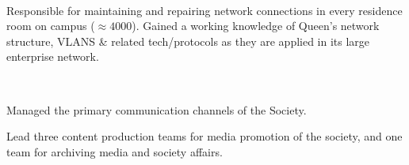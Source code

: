 \documentclass[]{hieudo-build}
\begin{document}
\begin{minipage}[t]{0.69\textwidth}
\\
\begin{tightemize}
\item Responsible for maintaining and repairing network connections in every residence room on campus ($\approx 4000$). Gained a working knowledge of Queen's network structure, VLANS \& related tech/protocols as they are applied in its large enterprise network.
\end{tightemize}
\sectionsep

 \\
\begin{tightemize} 
\item Managed the primary communication channels of the Society.
\item Lead three content production teams for media promotion of the society, and one team for archiving media and society affairs.
\end{tightemize}
\sectionsep




\end{minipage}
\end{document}
